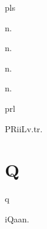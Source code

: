 \begin{multicols*}{2}
\begin{dictroot}{pl}{s}
\begin{dictentry}{}{n.}
    \end{dictentry}
    \begin{dictentry}{}{n.}
    \end{dictentry}
    \begin{dictentry}{}{n.}
    \end{dictentry}
    \begin{dictentry}{}{n.}
    \end{dictentry}
\end{dictroot}

\begin{dictroot}{pr}{l}
    \begin{dictentry}{PRiiL}{v.tr.}
    \end{dictentry}
\end{dictroot}

\section*{Q}

\begin{dictroot}{q}{\bigglot}
    \begin{dictentry}{iQaa\bigglot}{n.}
    \end{dictentry}
\end{dictroot}


\end{multicols*}
